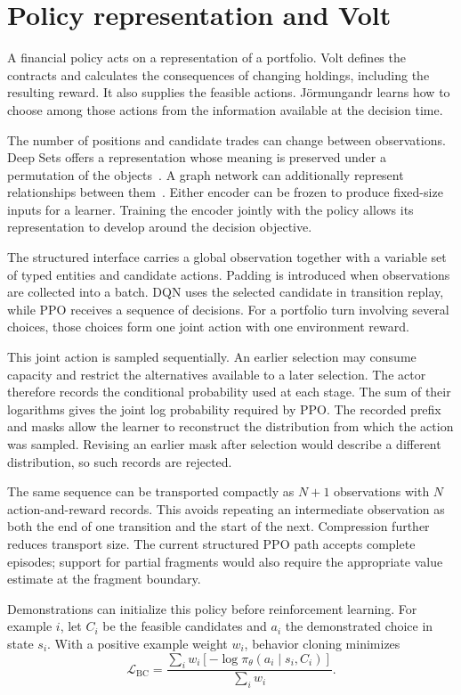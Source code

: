\documentclass{strategynet-journal}
\begin{document}
\section{Policy representation and Volt}

A financial policy acts on a representation of a portfolio. Volt defines the
contracts and calculates the consequences of changing holdings, including
the resulting reward. It also supplies the feasible actions. Jörmungandr
learns how to choose among those actions from the information available at
the decision time.

The number of positions and candidate trades can change between observations.
Deep Sets offers a representation whose meaning is preserved under a
permutation of the objects~\cite{deepsets}. A graph network can additionally
represent relationships between them~\cite{graphnet}. Either encoder can be
frozen to produce fixed-size inputs for a learner. Training the encoder jointly
with the policy allows its representation to develop around the decision
objective.

The structured interface carries a global observation together with a variable
set of typed entities and candidate actions. Padding is introduced when
observations are collected into a batch. DQN uses the selected candidate in
transition replay, while PPO receives a sequence of decisions. For a portfolio
turn involving several choices, those choices form one joint action with one
environment reward.

This joint action is sampled sequentially. An earlier selection may consume
capacity and restrict the alternatives available to a later selection. The
actor therefore records the conditional probability used at each stage. The
sum of their logarithms gives the joint log probability required by PPO.
The recorded prefix and masks allow the learner to reconstruct the distribution
from which the action was sampled. Revising an earlier mask after selection
would describe a different distribution, so such records are rejected.

The same sequence can be transported compactly as $N+1$ observations with
$N$ action-and-reward records. This avoids repeating an intermediate observation
as both the end of one transition and the start of the next. Compression
further reduces transport size. The current structured PPO path accepts
complete episodes; support for partial fragments would also require the
appropriate value estimate at the fragment boundary.

Demonstrations can initialize this policy before reinforcement learning.
For example $i$, let $C_i$ be the feasible candidates and $a_i$ the demonstrated
choice in state $s_i$. With a positive example weight $w_i$, behavior cloning
minimizes
\[
  \mathcal L_{\mathrm{BC}} =
  \frac{\sum_i w_i[-\log \pi_\theta(a_i\mid s_i,C_i)]}
       {\sum_i w_i}.
\]
\end{document}
